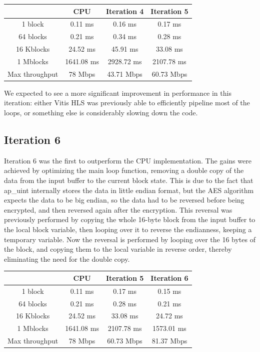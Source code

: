 \documentclass[12pt,oneside,a4paper]{article}
\begin{document}
\begin{table}[H]
	\centering
	\begin{tabular}{cccc}
		\toprule
		 & CPU & Iteration 4 & Iteration 5 \\
		\midrule
		1 block & 0.11 ms & 0.16 ms & 0.17 ms \\
		64 blocks & 0.21 ms & 0.34 ms & 0.28 ms \\
		16 Kblocks & 24.52 ms & 45.91 ms & 33.08 ms \\
		1 Mblocks & 1641.08 ms & 2928.72 ms & 2107.78 ms \\
		Max throughput & 78 Mbps & 43.71 Mbps & 60.73 Mbps \\
		\bottomrule
	\end{tabular}
\end{table}

We expected to see a more significant improvement in performance in this iteration: either Vitis HLS was previously able to efficiently pipeline most of the loops, or something else is considerably slowing down the code.

\subsection{Iteration 6} \label{subsec:iter6}
Iteration 6 was the first to outperform the CPU implementation. The gains were achieved by optimizing the main loop function, removing a double copy of the data from the input buffer to the current block state.
This is due to the fact that ap\_uint internally stores the data in little endian format, but the AES algorithm expects the data to be big endian, so the data had to be reversed before being encrypted, and then reversed again after the encryption.
This reversal was previously performed by copying the whole 16-byte block from the input buffer to the local block variable, then looping over it to reverse the endianness, keeping a temporary variable.
Now the reversal is performed by looping over the 16 bytes of the block, and copying them to the local variable in reverse order, thereby eliminating the need for the double copy.

\begin{table}[h!]
	\centering
	\begin{tabular}{cccc}
		\toprule
		 & CPU & Iteration 5 & Iteration 6 \\
		\midrule
		1 block & 0.11 ms & 0.17 ms & 0.15 ms \\
		64 blocks & 0.21 ms & 0.28 ms & 0.21 ms \\
		16 Kblocks & 24.52 ms & 33.08 ms & 24.72 ms \\
		1 Mblocks & 1641.08 ms & 2107.78 ms & 1573.01 ms \\
		Max throughput & 78 Mbps & 60.73 Mbps & 81.37 Mbps \\
		\bottomrule
	\end{tabular}
\end{table}
\end{document}
